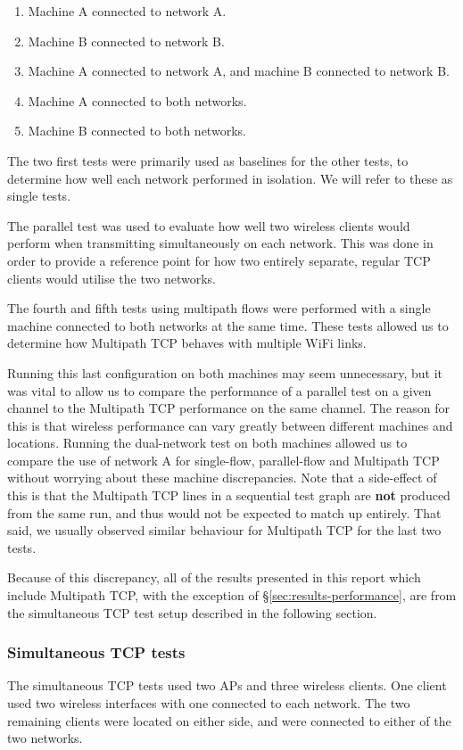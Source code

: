 \begin{enumerate}
  \item Machine A connected to network A.
  \item Machine B connected to network B.
  \item Machine A connected to network A, and machine B connected to network B.
  \item Machine A connected to both networks.
  \item Machine B connected to both networks.
\end{enumerate}

The two first tests were primarily used as baselines for the other tests, to determine
how well each network performed in isolation. We will refer to these as single tests.

The parallel test was used to evaluate how well two wireless clients would perform
when transmitting simultaneously on each network. This was done in order to
provide a reference point for how two entirely separate, regular TCP clients
would utilise the two networks.

The fourth and fifth tests using multipath flows were performed with a single machine
connected to both networks at
the same time. These tests allowed us to determine how Multipath TCP behaves
with multiple WiFi links.

Running this last configuration on both machines may seem unnecessary,
but it was vital to allow us to compare the performance of a parallel test on a
given channel to the Multipath TCP performance on the same channel. The reason
for this is that wireless performance can vary greatly between different machines and
locations. Running the dual-network test on both machines allowed us to compare
the use of network A for single-flow, parallel-flow and Multipath TCP without worrying
about these machine discrepancies. Note that a side-effect of this is that the
Multipath TCP lines in a sequential test graph are \textbf{not} produced from the same run, and thus
would not be expected to match up entirely. That said, we usually observed
similar behaviour for Multipath TCP for the last two tests.

Because of this discrepancy, all of the results presented in this report which
include Multipath TCP, with the exception of \S\ref{sec:results-performance}, are
from the simultaneous TCP test setup described in the following section.

\subsubsection{Simultaneous TCP tests}
\label{sec:met:setups:simtcp}
The simultaneous TCP tests used two APs and three
wireless clients. One client used two wireless interfaces with one
connected to each network. The two remaining clients were located on either side, and were connected to either of the two networks.

